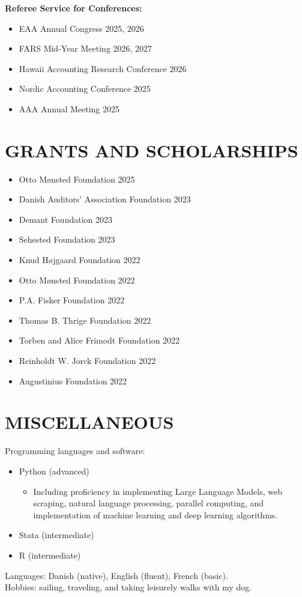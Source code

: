 \documentclass[letterpaper,9pt]{extarticle}
\begin{document}
\noindent \textbf{Referee Service for Conferences:}
\begin{itemize}
    \item EAA Annual Congress 2025, 2026
    \item FARS Mid-Year Meeting 2026, 2027
    \item Hawaii Accounting Research Conference 2026
    \item Nordic Accounting Conference 2025
    \item AAA Annual Meeting 2025
\end{itemize}

\section*{GRANTS AND SCHOLARSHIPS}
\noindent
\begin{itemize}
    \item Otto Mønsted Foundation  \hfill 2025
    \item Danish Auditors' Association Foundation  \hfill 2023
    \item Demant Foundation  \hfill 2023
    \item Sehested Foundation  \hfill 2023
    \item Knud Højgaard Foundation  \hfill 2022
    \item Otto Mønsted Foundation  \hfill 2022
    \item P.A. Fisker Foundation  \hfill 2022
    \item Thomas B. Thrige Foundation  \hfill 2022
    \item Torben and Alice Frimodt Foundation  \hfill 2022
    \item Reinholdt W. Jorck Foundation  \hfill 2022
    \item Augustinius Foundation  \hfill 2022 
\end{itemize}

    
\section*{MISCELLANEOUS}
\noindent Programming languages and software: 
\begin{itemize}
    \item Python (advanced)
    \begin{itemize}
        \item Including proficiency in implementing Large Language Models, web scraping, natural language processing, parallel computing, and implementation of machine learning and deep learning algorithms.
    \end{itemize} 
    \item Stata (intermediate)
    \item R (intermediate)
\end{itemize}
Languages: Danish (native), English (fluent), French (basic). \\
Hobbies: sailing, traveling, and taking leisurely walks with my dog.   
\end{document}
